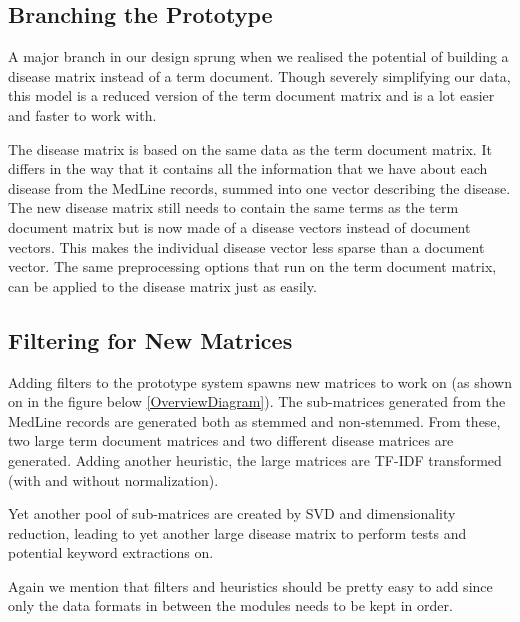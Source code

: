 \subsection{Branching the Prototype\label{DiseaseMatrix}}

A major branch in our design sprung when we realised the potential of
building a disease matrix instead of a term document. Though severely
simplifying our data, this model is a reduced version of the term
document matrix and is a lot easier and faster to work with.

The disease matrix is based on the same data as the term document
matrix. It differs in the way that it contains all the information
that we have about each disease from the MedLine records, summed into
one vector describing the disease. The new disease matrix still needs to
contain the same terms as the term document matrix but is now made of
a disease vectors instead of document vectors. This makes the
individual disease vector less sparse than a document vector. The same
preprocessing options that run on the term document matrix, can be
applied to the disease matrix just as easily.

\subsection{Filtering for New Matrices\label{FilteringMatrix}}

Adding filters to the prototype system spawns new matrices to work on
(as shown on in the figure below \ref{OverviewDiagram}). The
sub-matrices generated from the MedLine records are generated both as
stemmed and non-stemmed. From these, two large term document matrices
and two different disease matrices are generated. Adding another heuristic, the
large matrices are TF-IDF transformed (with and without
normalization).

Yet another pool of sub-matrices are created by SVD and dimensionality
reduction, leading to yet another large disease matrix to perform
tests and potential keyword extractions on.

Again we mention that filters and heuristics should be pretty easy to
add since only the data formats in between the modules needs to be
kept in order.

